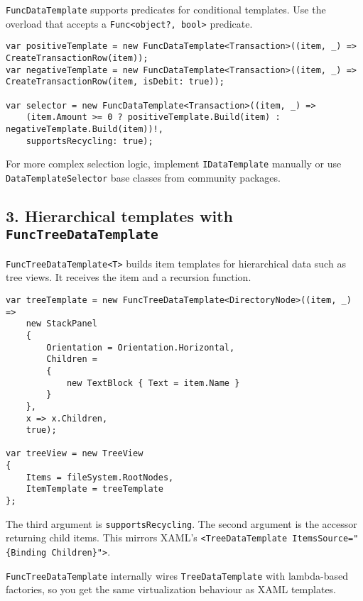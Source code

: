 \passthrough{\lstinline!FuncDataTemplate!} supports predicates for
conditional templates. Use the overload that accepts a
\passthrough{\lstinline!Func<object?, bool>!} predicate.

\begin{lstlisting}
var positiveTemplate = new FuncDataTemplate<Transaction>((item, _) => CreateTransactionRow(item));
var negativeTemplate = new FuncDataTemplate<Transaction>((item, _) => CreateTransactionRow(item, isDebit: true));

var selector = new FuncDataTemplate<Transaction>((item, _) =>
    (item.Amount >= 0 ? positiveTemplate.Build(item) : negativeTemplate.Build(item))!,
    supportsRecycling: true);
\end{lstlisting}

For more complex selection logic, implement
\passthrough{\lstinline!IDataTemplate!} manually or use
\passthrough{\lstinline!DataTemplateSelector!} base classes from
community packages.

\subsection{\texorpdfstring{3. Hierarchical templates with
\texttt{FuncTreeDataTemplate}}{3. Hierarchical templates with FuncTreeDataTemplate}}\label{hierarchical-templates-with-functreedatatemplate}

\passthrough{\lstinline!FuncTreeDataTemplate<T>!} builds item templates
for hierarchical data such as tree views. It receives the item and a
recursion function.

\begin{lstlisting}
var treeTemplate = new FuncTreeDataTemplate<DirectoryNode>((item, _) =>
    new StackPanel
    {
        Orientation = Orientation.Horizontal,
        Children =
        {
            new TextBlock { Text = item.Name }
        }
    },
    x => x.Children,
    true);

var treeView = new TreeView
{
    Items = fileSystem.RootNodes,
    ItemTemplate = treeTemplate
};
\end{lstlisting}

The third argument is \passthrough{\lstinline!supportsRecycling!}. The
second argument is the accessor returning child items. This mirrors
XAML's
\passthrough{\lstinline!<TreeDataTemplate ItemsSource="\{Binding Children\}">!}.

\passthrough{\lstinline!FuncTreeDataTemplate!} internally wires
\passthrough{\lstinline!TreeDataTemplate!} with lambda-based factories,
so you get the same virtualization behaviour as XAML templates.


